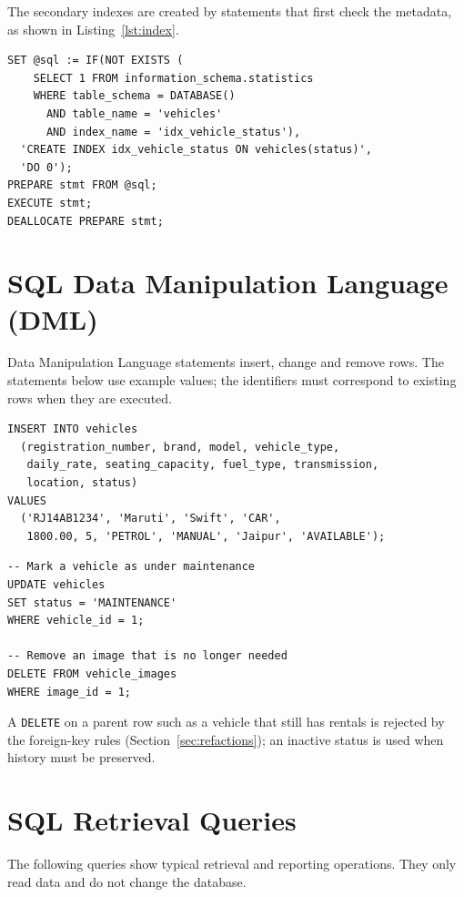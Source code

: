 \documentclass[10pt,a4paper]{report}
\newcommand{\col}[1]{\texttt{#1}}
\begin{document}
The secondary indexes are created by statements that first check the metadata, as shown in Listing~\ref{lst:index}.

\begin{lstlisting}[caption={Idempotent creation of an index},label={lst:index}]
SET @sql := IF(NOT EXISTS (
    SELECT 1 FROM information_schema.statistics
    WHERE table_schema = DATABASE()
      AND table_name = 'vehicles'
      AND index_name = 'idx_vehicle_status'),
  'CREATE INDEX idx_vehicle_status ON vehicles(status)',
  'DO 0');
PREPARE stmt FROM @sql;
EXECUTE stmt;
DEALLOCATE PREPARE stmt;
\end{lstlisting}

\section{SQL Data Manipulation Language (DML)}
Data Manipulation Language statements insert, change and remove rows. The statements below use example values; the identifiers must correspond to existing rows when they are executed.

\begin{lstlisting}[caption={Inserting a vehicle},label={lst:insert}]
INSERT INTO vehicles
  (registration_number, brand, model, vehicle_type,
   daily_rate, seating_capacity, fuel_type, transmission,
   location, status)
VALUES
  ('RJ14AB1234', 'Maruti', 'Swift', 'CAR',
   1800.00, 5, 'PETROL', 'MANUAL', 'Jaipur', 'AVAILABLE');
\end{lstlisting}

\begin{lstlisting}[caption={Updating and deleting rows},label={lst:updatedelete}]
-- Mark a vehicle as under maintenance
UPDATE vehicles
SET status = 'MAINTENANCE'
WHERE vehicle_id = 1;

-- Remove an image that is no longer needed
DELETE FROM vehicle_images
WHERE image_id = 1;
\end{lstlisting}

A \col{DELETE} on a parent row such as a vehicle that still has rentals is rejected by the foreign-key rules (Section~\ref{sec:refactions}); an inactive status is used when history must be preserved.

\section{SQL Retrieval Queries}
The following queries show typical retrieval and reporting operations. They only read data and do not change the database.
\end{document}
